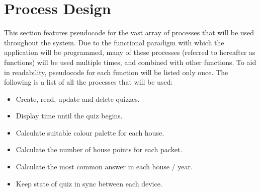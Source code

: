 \section{Process Design}
This section features pseudocode for the vast array of processes that will be used throughout the system. Due to the functional paradigm with which the application will be programmed, many of these processes (referred to hereafter as functions) will be used multiple times, and combined with other functions. To aid in readability, pseudocode for each function will be listed only once. The following is a list of all the processes that will be used:

\begin{itemize}
\item Create, read, update and delete quizzes.
\item Display time until the quiz begins.
\item Calculate suitable colour palette for each house.
\item Calculate the number of house points for each packet.
\item Calculate the most common answer in each house / year.
\item Keep state of quiz in sync between each device.
\end{itemize}




